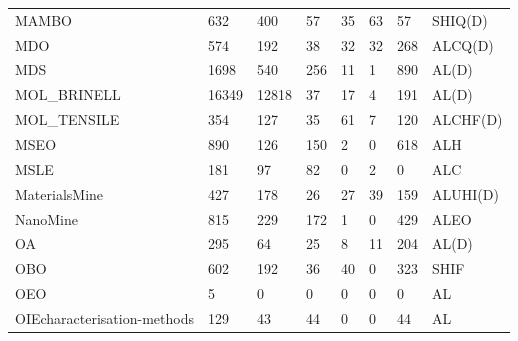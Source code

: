 \begin{table}
\begin{tabular}{m{3.5cm}m{1cm}m{1cm}m{1cm}m{1cm}m{1cm}m{1cm}m{1cm}}
MAMBO                       &       632 &               400 &         57 &                   35 &                     63 &                       57 &          SHIQ(D) \\
MDO                         &       574 &               192 &         38 &                   32 &                     32 &                      268 &          ALCQ(D) \\
MDS                         &      1698 &               540 &        256 &                   11 &                      1 &                      890 &            AL(D) \\
MOL\_BRINELL                 &     16349 &             12818 &         37 &                   17 &                      4 &                      191 &            AL(D) \\
MOL\_TENSILE                 &       354 &               127 &         35 &                   61 &                      7 &                      120 &         ALCHF(D) \\
MSEO                        &       890 &               126 &        150 &                    2 &                      0 &                      618 &              ALH \\
MSLE                        &       181 &                97 &         82 &                    0 &                      2 &                        0 &              ALC \\
MaterialsMine               &       427 &               178 &         26 &                   27 &                     39 &                      159 &         ALUHI(D) \\
NanoMine                    &       815 &               229 &        172 &                    1 &                      0 &                      429 &             ALEO \\
OA                          &       295 &                64 &         25 &                    8 &                     11 &                      204 &            AL(D) \\
OBO                         &       602 &               192 &         36 &                   40 &                      0 &                      323 &             SHIF \\
OEO                         &         5 &                 0 &          0 &                    0 &                      0 &                        0 &               AL \\
OIEcharacterisation-methods &       129 &                43 &         44 &                    0 &                      0 &                       44 &               AL \\

\end{tabular}
\end{table}
